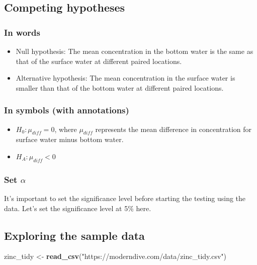 \documentclass[12pt,]{krantz}
\makeatletter
\newenvironment{Shaded}{\begin{snugshade}}{\end{snugshade}}
\newcommand{\KeywordTok}[1]{\textcolor[rgb]{0.27,0.27,0.27}{\textbf{#1}}}
\newcommand{\StringTok}[1]{\textcolor[rgb]{0.5,0.5,0.5}{#1}}
\newcommand{\NormalTok}[1]{#1}
\providecommand{\tightlist}{%
  \setlength{\itemsep}{0pt}\setlength{\parskip}{0pt}}
\newenvironment{kframe}{%
\medskip{}
\setlength{\fboxsep}{.8em}
 \def\at@end@of@kframe{}%
 \ifinner\ifhmode%
  \def\at@end@of@kframe{\end{minipage}}%
  \begin{minipage}{\columnwidth}%
 \fi\fi%
 \def\FrameCommand##1{\hskip\@totalleftmargin \hskip-\fboxsep
 \colorbox{shadecolor}{##1}\hskip-\fboxsep
     \hskip-\linewidth \hskip-\@totalleftmargin \hskip\columnwidth}%
 \MakeFramed {\advance\hsize-\width
   \@totalleftmargin\z@ \linewidth\hsize
   \@setminipage}}%
 {\par\unskip\endMakeFramed%
 \at@end@of@kframe}
\renewenvironment{Shaded}{\begin{kframe}}{\end{kframe}}
\makeatother
\begin{document}
\subsection{Competing hypotheses}\label{competing-hypotheses-4}

\subsubsection*{In words}\label{in-words-4}


\begin{itemize}
\item
  Null hypothesis: The mean concentration in the bottom water is the
  same as that of the surface water at different paired locations.
\item
  Alternative hypothesis: The mean concentration in the surface water is
  smaller than that of the bottom water at different paired locations.
\end{itemize}

\subsubsection*{In symbols (with
annotations)}\label{in-symbols-with-annotations-4}


\begin{itemize}
\tightlist
\item
  \(H_0: \mu_{diff} = 0\), where \(\mu_{diff}\) represents the mean
  difference in concentration for surface water minus bottom water.
\item
  \(H_A: \mu_{diff} < 0\)
\end{itemize}

\subsubsection*{\texorpdfstring{Set
\(\alpha\)}{Set \textbackslash{}alpha}}\label{set-alpha-4}


It's important to set the significance level before starting the testing
using the data. Let's set the significance level at 5\% here.

\subsection{Exploring the sample
data}\label{exploring-the-sample-data-4}

\begin{Shaded}
\begin{Highlighting}[]
\NormalTok{zinc_tidy <-}\StringTok{ }\KeywordTok{read_csv}\NormalTok{(}\StringTok{"https://moderndive.com/data/zinc_tidy.csv"}\NormalTok{)}
\end{Highlighting}
\end{Shaded}
\end{document}
